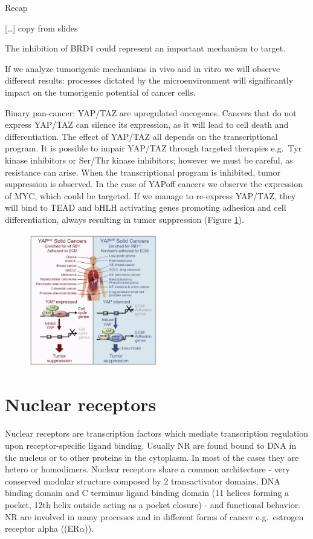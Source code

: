 Recap

{[}\ldots{]} copy from slides

The inhibition of BRD4 could represent an important mechanism to target.

If we analyze tumorigenic mechanisms in vivo and in vitro we will observe different results: processes dictated by the microenvironment will significantly impact on the tumorigenic potential of cancer cells.

Binary pan-cancer: YAP/TAZ are upregulated oncogenes. Cancers that do not express YAP/TAZ can silence its expression, as it will lead to cell death and differentiation. The effect of YAP/TAZ all depends on the transcriptional program. It is possible to impair YAP/TAZ through targeted therapies e.g.~Tyr kinase inhibitors or Ser/Thr kinase inhibitors; however we must be careful, as resistance can arise. When the transcriptional program is inhibited, tumor suppression is observed. In the case of YAPoff cancers we observe the expression of MYC, which could be targeted. If we manage to re-express YAP/TAZ, they will bind to TEAD and bHLH activating genes promoting adhesion and cell differentiation, always resulting in tumor suppression (Figure \ref{fig:canyt}).

\begin{figure}
\centering
\includegraphics[width=0.5\textwidth]{../_resources/Screen_Shot_2022-11-18_at_11-11-12.png}
\caption{}
\label{fig:canyt}
\end{figure}

\hypertarget{nuclear-receptors}{%
\section{Nuclear receptors}\label{nuclear-receptors}}

Nuclear receptors are transcription factors which mediate transcription regulation upon receptor-specific ligand binding. Usually NR are found bound to DNA in the nucleus or to other proteins in the cytoplasm. In most of the cases they are hetero or homodimers. Nuclear receptors share a common architecture - very conserved modular structure composed by 2 transactivator domains, DNA binding domain and C terminus ligand binding domain (11 helices forming a pocket, 12th helix outside acting as a pocket closure) - and functional behavior. NR are involved in many processes and in different forms of cancer e.g.~estrogen receptor alpha ((ER$\alpha$)).

